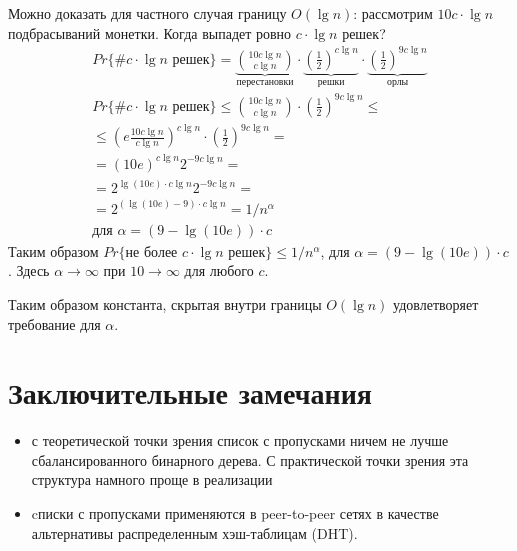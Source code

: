 \documentclass[11pt]{article}
\begin{document}
Можно доказать для частного случая границу $O(\lg n)$: рассмотрим $10 c \cdot \lg n$ подбрасываний монетки. Когда выпадет ровно $c \cdot \lg n$ решек?
\begin{align*}
  Pr\{\# c \cdot \lg n\text{ решек}\} = 
  \underbrace{\binom{10 c \lg n}{c \lg n}}_{\text{перестановки}} \cdot
  \underbrace{{\left(\frac{1}{2}\right)}^{c\lg n}}_{\text{решки}} \cdot
  \underbrace{{\left(\frac{1}{2}\right)}^{9c\lg n}}_{\text{орлы}} \\
  Pr\{\# c \cdot \lg n\text{ решек}\} \leqslant \binom{10 c \lg n}{c \lg n} \cdot
  {\left(\frac{1}{2}\right)}^{9c\lg n} \leqslant \\
  \leqslant {\left(e\frac{10 c \lg n}{c \lg n} \right)}^{c\lg n} \cdot
  {\left(\frac{1}{2}\right)}^{9c\lg n} = \\
  = {(10 e)}^{c \lg n} 2^{-9c\lg n} = \\
  = 2^{\lg{(10 e)}\cdot c \lg n}2^{-9c\lg n} = \\
  = 2^{(\lg{(10 e)}-9) \cdot c \lg n} = 1 / n^\alpha \\
  \text{для }\alpha = (9-\lg{(10 e)}) \cdot c
\end{align*}
Таким образом $Pr\{\text{не более }c\cdot \lg n\text{ решек}\} \leqslant 1/n^\alpha$, для $\alpha = (9-\lg{(10 e)}) \cdot c$. Здесь $\alpha \to \infty$ при $10 \to \infty$ для любого $c$.

Таким образом константа, скрытая внутри границы $O(\lg n)$ удовлетворяет требование для $\alpha$.

\section{Заключительные замечания}
\begin{itemize}
\item с теоретической точки зрения список с пропусками ничем не лучше сбалансированного бинарного дерева. С практической точки зрения эта структура намного проще в реализации
\item cписки с пропусками применяются в peer-to-peer сетях в качестве альтернативы распределенным хэш-таблицам (DHT).
\end{itemize}
\end{document}
